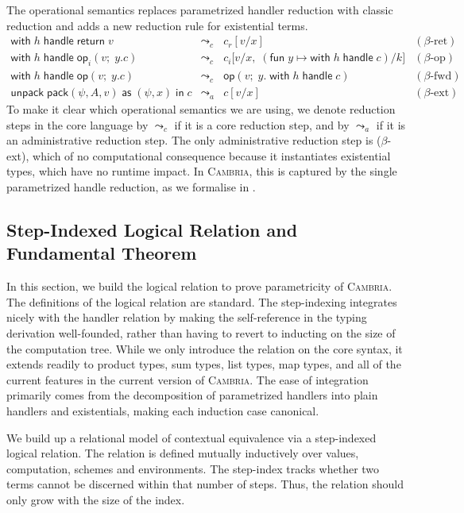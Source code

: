 \documentclass[acmsmall,screen,review,anonymous]{acmart}
\newcommand{\cambria}{\textsc{Cambria}}
\newcommand{\op}{\mathsf{op}}
\newcommand{\ret}{\mathsf{return}\;}
\newcommand{\iin}{\;\mathsf{in}\;}
\newcommand{\fun}{\mathsf{fun}\;}
\newcommand{\with}{\mathsf{with}\;}
\newcommand{\handle}{\;\mathsf{handle}\;}
\newcommand{\pack}{\mathsf{pack}}
\newcommand{\unpack}{\mathsf{unpack}\;}
\newcommand{\as}{\;\mathsf{as}\;}
\begin{document}
The operational semantics replaces parametrized handler reduction with classic reduction and adds a new reduction rule for existential terms.
\[
\begin{array}{lcll}
  \with h \handle \ret v
    & \leadsto_c & c_r[v/x]
    & (\beta\text{-ret}) \\
  \with h \handle \op_i(v;\;y.c)
    & \leadsto_c & c_i\bigl[v/x,\;(\fun y \mapsto \with h \handle c)/k\bigr]
    & (\beta\text{-op}) \\
  \with h \handle \op(v;\;y.c)
    & \leadsto_c & \op(v;\;y.\;\with h \handle c)
    & (\beta\text{-fwd}) \\
  \unpack \pack(\psi, A, v) \as (\psi, x) \iin c
    & \leadsto_a & c[v / x]
    & (\beta\text{-ext})
\end{array}
\]
To make it clear which operational semantics we are using, we denote reduction steps in the core language
by $\leadsto_c$ if it is a core reduction step, and by $\leadsto_a$ if it is an administrative reduction step.
The only administrative reduction step is ($\beta$-ext), which of no computational consequence because it
instantiates existential types, which have no runtime impact.
In \cambria{}, this is captured by the single parametrized handle reduction, as we formalise in .

\subsection{Step-Indexed Logical Relation and Fundamental Theorem}

In this section, we build the logical relation to prove parametricity of \cambria{}. The definitions of the logical relation are standard.
The step-indexing integrates nicely with the handler relation by making the self-reference in the typing derivation well-founded,
rather than having to revert to inducting on the size of the computation tree. While we only introduce the relation on the core syntax,
it extends readily to product types, sum types, list types, map types, and all of the current features in the current version of \cambria{}.
The ease of integration primarily comes from the decomposition of parametrized handlers into plain handlers and existentials, making each induction case canonical.

We build up a relational model of contextual equivalence via a step-indexed logical relation.
The relation is defined mutually inductively over values, computation, schemes and environments.
The step-index tracks whether two terms cannot be discerned within that number of steps.
Thus, the relation should only grow with the size of the index.
\end{document}
